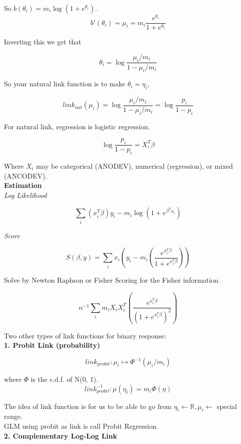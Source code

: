 \documentclass[11pt,fleqn]{book} %
\begin{document}
So $b(\theta_i) = m_i \log(1 + e^{\theta_i})$.\\

		$$b'(\theta_i) = \mu_i = m_i \frac{e^{\theta_i}}{1+ e^{\theta_i}} $$

Inverting this we get that

		$$\theta_i = \log\frac{\mu_i/m_i}{1 - \mu_i/m_i} $$

So your natural link function is to make $\theta_i = \eta_i$, 

		$$link_{nat}(\mu_i) = \log\frac{\mu_i/m_i}{1 - \mu_i/m_i} = \log\frac{p_i}{1 - p_i} $$


For natural link, regression is logistic regression. 

		$$\log \frac{p_i}{1 - p_i} = X_i^T\beta  $$

Where $X_i$ may be categorical (ANODEV), numerical (regression), or mixed (ANCODEV). \\

\textbf{Estimation}\\

\textit{Log Likelihood}

		$$\sum_i (x_i^T \beta) y_i - m_i \log(1 + e^{\beta^T x_i}) $$

\textit{Score}

		$$S(\beta, y) = \sum_i x_i (y_i - m_i(\frac{e^{x_i^T \beta}}{1 + e^{x_i^T \beta}})) $$

Solve by Newton Raphson or Fisher Scoring for the Fisher information. 

		$$n^{-1} \sum_i m_i X_i X_i^T (\frac{e^{x_i^T \beta}}{(1 + e^{x_i^T \beta})^2}) $$


Two other types of link functions for binary response:\\


\textbf{1. Probit Link (probability)}

		$$link_{probit}: \mu_i \mapsto \Phi^{-1} (\mu_i/m_i) $$

where $\Phi$ is the c.d.f. of N(0, 1). \\


		$$link_{probit}^{-1}: \mu(\eta_i) = m_i \Phi(\eta) $$

The idea of link function is for us to be able to go from $\eta_i \leftarrow \mathbb{R}, \mu_i \leftarrow $ special range. \\

GLM using probit as link is call Probit Regression. \\

\textbf{2. Complementary Log-Log Link}\\
\end{document}

